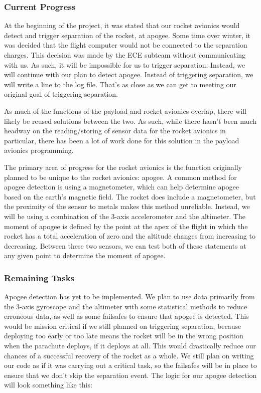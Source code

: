 \documentclass[onecolumn, draftclsnofoot, 10pt, compsoc]{IEEEtran}
\begin{document}
\subsubsection{Current Progress}
At the beginning of the project, it was stated that our rocket avionics would detect and trigger separation of the rocket, at apogee.  
Some time over winter, it was decided that the flight computer would not be connected to the separation charges.  
This decision was made by the ECE subteam without communicating with us.  As such, it will be impossible for us to trigger separation.
Instead, we will continue with our plan to detect apogee.  Instead of triggering separation, we will write a line to the log file.  That's as close as we can get to meeting our original goal of triggering separation.

As much of the functions of the payload and rocket avionics overlap, there will likely be reused solutions between the two. 
As such, while there hasn’t been much headway on the reading/storing of sensor data for the rocket avionics in particular, there has been a lot of work done for this solution in the payload avionics programming.

The primary area of progress for the rocket avionics is the function originally planned to be unique to the rocket avionics: apogee. 
A common method for apogee detection is using a magnetometer, which can help determine apogee based on the earth’s magnetic field. 
The rocket does include a magnetometer, but the proximity of the sensor to metals makes this method unreliable. 
Instead, we will be using a combination of the 3-axis accelerometer and the altimeter. 
The moment of apogee is defined by the point at the apex of the flight in which the rocket has a total acceleration of zero and the altitude changes from increasing to decreasing. 
Between these two sensors, we can test both of these statements at any given point to determine the moment of apogee. 


\subsubsection{Remaining Tasks}
Apogee detection has yet to be implemented. 
We plan to use data primarily from the 3-axis gyroscope and the altimeter with some statistical methods to reduce erroneous data, as well as some failsafes to ensure that apogee is detected. 
This would be mission critical if we still planned on triggering separation, because deploying too early or too late means the rocket will be in the wrong position when the parachute deploys, if it deploys at all. 
This would drastically reduce our chances of a successful recovery of the rocket as a whole. 
We still plan on writing our code as if it was carrying out a critical task, so the failsafes will be in place to ensure that we don’t skip the separation event.
The logic for our apogee detection will look something like this:
\end{document}
